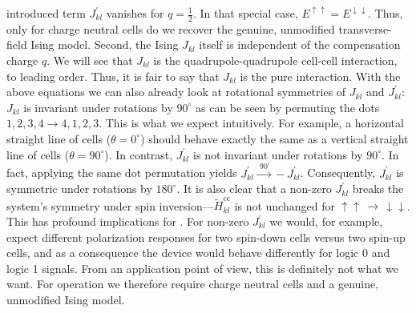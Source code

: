 introduced term $J^{\prime}_{kl}$ vanishes for $q=\frac{1}{2}$. In that special
case, $E^{\uparrow\uparrow} = E^{\downarrow\downarrow}$. Thus, only for charge
neutral cells do we recover the genuine, unmodified transverse-field Ising
model. Second, the Ising $J_{kl}$ itself is independent of the compensation
charge $q$. We will see that $J_{kl}$ is the quadrupole-quadrupole cell-cell
interaction, to leading order. Thus, it is fair to say that $J_{kl}$ is the pure
 interaction. With the above equations we can also already look at
rotational symmetries of $J_{kl}$ and $J^{\prime}_{kl}$: $J_{kl}$ is invariant
under rotations by $90^{\circ}$ as can be seen by permuting the dots $1,2,3,4
\rightarrow 4,1,2,3$. This is what we expect intuitively. For example, a
horizontal straight line of cells ($\theta = 0^{\circ}$) should behave exactly
the same as a vertical straight line of cells ($\theta = 90^{\circ}$). In
contrast, $J^{\prime}_{kl}$ is not invariant under rotations by $90^{\circ}$. In
fact, applying the same dot permutation yields $J^{\prime}_{kl}
\xrightarrow{\,\, 90^{\circ}} - J^{\prime}_{kl}$. Consequently,
$J^{\prime}_{kl}$ is symmetric under rotations by $180^{\circ}$. It is also
clear that a non-zero $J^{\prime}_{kl}$ breaks the system's symmetry under spin
inversion---$\tilde{H}^\text{cc}_{kl}$ is not unchanged for $\uparrow\uparrow \,
\rightarrow \, \downarrow\downarrow$. This has profound implications for
. For non-zero $J^{\prime}_{kl}$ we would, for example, expect
different polarization responses for two spin-down cells versus two spin-up
cells, and as a consequence the device would behave differently for logic 0 and
logic 1 signals. From an application point of view, this is definitely not what
we want. For  operation we therefore require charge neutral cells and
a genuine, unmodified Ising model.

